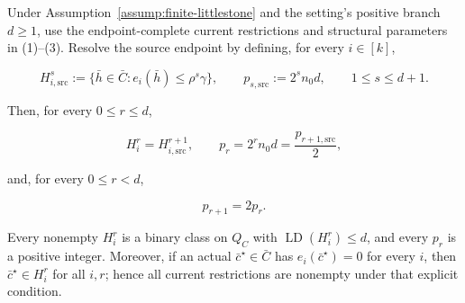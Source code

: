 \begin{lemma}\label{lem:step-008-stage-map}
Under Assumption~\ref{assump:finite-littlestone} and the setting's
positive branch \(d\ge1\), use the endpoint-complete current restrictions
and structural parameters in (1)--(3).  Resolve the source endpoint by
defining, for every \(i\in[k]\),

\[
 H_{i,\mathrm{src}}^s
 :=\{\bar h\in\bar C:e_i(\bar h)\le\rho^s\gamma\},
 \qquad
 p_{s,\mathrm{src}}:=2^s n_0d,
 \qquad 1\le s\le d+1.
\tag{14}
\]

Then, for every \(0\le r\le d\),

\[
 H_i^r=H_{i,\mathrm{src}}^{r+1},
 \qquad
 p_r=2^rn_0d=\frac{p_{r+1,\mathrm{src}}}{2},
\tag{15}
\]

and, for every \(0\le r<d\),

\[
 p_{r+1}=2p_r.
\tag{16}
\]

Every nonempty \(H_i^r\) is a binary class on \(Q_C\) with
\(\operatorname{LD}(H_i^r)\le d\), and every \(p_r\) is a positive integer.
Moreover, if an actual \(\bar c^\star\in\bar C\) has
\(e_i(\bar c^\star)=0\) for every \(i\), then
\(\bar c^\star\in H_i^r\) for all \(i,r\); hence all current restrictions
are nonempty under that explicit condition.


\end{lemma}


